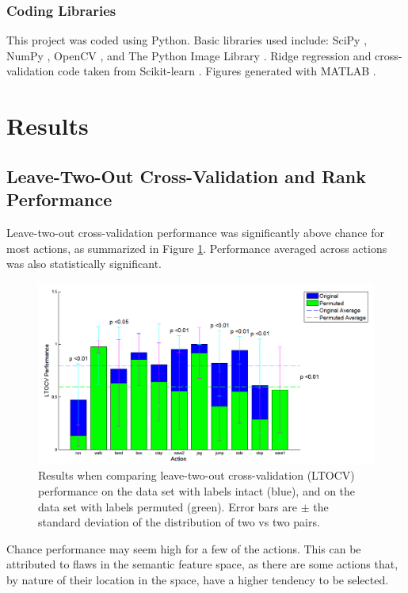 \documentclass{article}
\begin{document}
\subsubsection{Coding Libraries}
This project was coded using Python. Basic libraries used include: SciPy \cite{scipy}, NumPy \cite{numpy}, OpenCV \cite{opencv}, and The Python Image Library \cite{pil}. Ridge regression and cross-validation code taken from Scikit-learn \cite{scikit}. Figures generated with MATLAB \cite{matlab}.

\section{Results}

\subsection{Leave-Two-Out Cross-Validation and Rank Performance}
Leave-two-out cross-validation performance was significantly above chance for most actions, as summarized in Figure \ref{ltocvplot}.  Performance averaged across actions was also statistically significant.

\begin{figure}[h]
  \centering
  \includegraphics[width=.9\linewidth]{ltocv_snap_new}
  \caption{Results when comparing leave-two-out cross-validation (LTOCV) performance on the data set with labels intact (blue), and on the data set with labels permuted (green). Error bars are $\pm$ the standard deviation of the distribution of two vs two pairs.}
  \label{ltocvplot}
\end{figure}

Chance performance may seem high for a few of the actions. This can be attributed to flaws in the semantic feature space, as there are some actions that, by nature of their location in the space, have a higher tendency to be selected.
\end{document}
